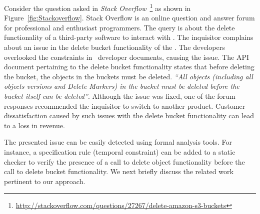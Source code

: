 Consider the question asked in \textit{Stack Overflow}~\footnote{ \url{http://stackoverflow.com/questions/27267/delete-amazon-s3-buckets}} as shown in Figure~\ref{fig:Stackoverflow}.
Stack Overflow is an online question and answer forum for professional and enthusiast programmers.
The query is about the delete functionality of a third-party software  to interact with \amazonAPI.
The inquisitor complains about an issue in the delete bucket functionality of the .
The  developers overlooked the constraints in \amazonAPI\ developer documents, causing the issue.
The API document pertaining to the  delete bucket functionality states that before deleting the bucket, the objects in the buckets must be deleted.
\textit{``All objects (including all objects versions and Delete Markers) in the bucket must be deleted before the bucket itself can be deleted''}.
Although the issue was fixed, one of the forum responses recommended the inquisitor to switch to another product.
Customer dissatisfaction caused by such issues with the delete bucket functionality can lead to a loss in revenue.
 
The presented issue can be easily detected using formal analysis tools.
For instance, a specification rule (temporal constraint) can be added to a static checker to verify
the presence of a call to delete object functionality before the call to delete bucket functionality.
We next briefly discuss the related work pertinent to our approach.
 








